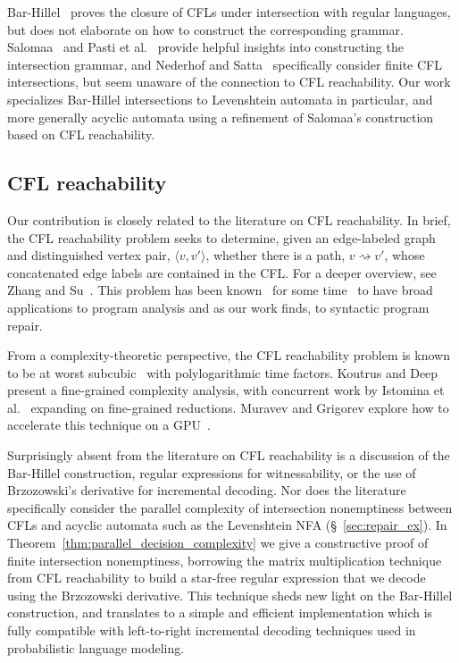 \documentclass[sigplan,acmsmall,nonacm,screen]{acmart}\settopmatter{printfolios=false,printccs=false,printacmref=false}
\begin{document}
Bar-Hillel~\cite{bar1961formal} proves the closure of CFLs under intersection with regular languages, but does not elaborate on how to construct the corresponding grammar. Salomaa~\cite{salomaa1973formal} and Pasti et al.~\cite{pasti2023intersection} provide helpful insights into constructing the intersection grammar, and Nederhof and Satta~\cite{nederhof2004language} specifically consider finite CFL intersections, but seem unaware of the connection to CFL reachability. Our work specializes Bar-Hillel intersections to Levenshtein automata in particular, and more generally acyclic automata using a refinement of Salomaa's construction~\cite{salomaa1973formal} based on CFL reachability.

\subsection{CFL reachability}

Our contribution is closely related to the literature on CFL reachability. In brief, the CFL reachability problem seeks to determine, given an edge-labeled graph and distinguished vertex pair, $\langle v, v' \rangle$, whether there is a path, $v \rightsquigarrow v'$, whose concatenated edge labels are contained in the CFL. For a deeper overview, see Zhang and Su~\cite{zhang2017context}. This problem has been known~\cite{reps1998program} for some time~\cite{kodumal2004set} to have broad applications to program analysis and as our work finds, to syntactic program repair.

From a complexity-theoretic perspective, the CFL reachability problem is known to be at worst subcubic~\cite{chistikov2022subcubic} with polylogarithmic time factors. Koutrus and Deep~\cite{koutris2023fine} present a fine-grained complexity analysis, with concurrent work by Istomina et al.~\cite{istomina2023fine} expanding on fine-grained reductions. Muravev and Grigorev explore how to accelerate this technique on a GPU~\cite{muravev2025universal}.

Surprisingly absent from the literature on CFL reachability is a discussion of the Bar-Hillel construction, regular expressions for witnessability, or the use of Brzozowski's derivative for incremental decoding. Nor does the literature specifically consider the parallel complexity of intersection nonemptiness between CFLs and acyclic automata such as the Levenshtein NFA (\S~\ref{sec:repair_ex}). In Theorem~\ref{thm:parallel_decision_complexity} we give a constructive proof of finite intersection nonemptiness, borrowing the matrix multiplication technique from CFL reachability to build a star-free regular expression that we decode using the Brzozowski derivative. This technique sheds new light on the Bar-Hillel construction, and translates to a simple and efficient implementation which is fully compatible with left-to-right incremental decoding techniques used in probabilistic language modeling.
\end{document}
